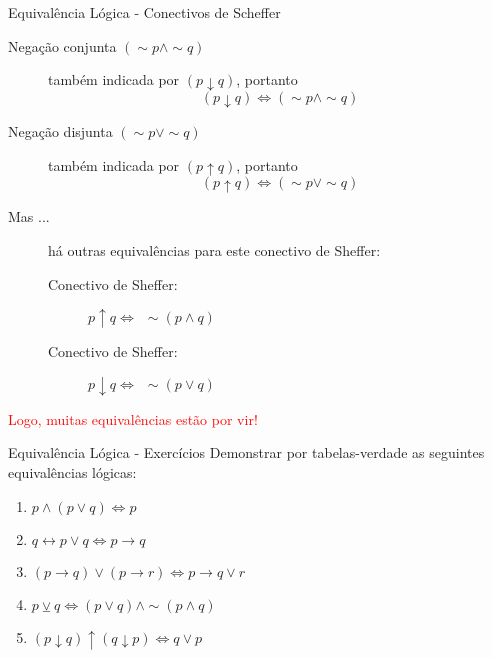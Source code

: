 \begin{frame}[t]{Equivalência Lógica - Conectivos de Scheffer} %
	
	
	\begin{description}
	\item [Negação conjunta $(\sim p \wedge \sim q)$] também indicada por $(p \downarrow q)$, 
	portanto $$(p \downarrow q) \Leftrightarrow  (\sim p \wedge \sim q)$$

	\item [Negação disjunta $(\sim p \vee \sim q)$] também indicada por $(p \uparrow q)$, 
	portanto $$(p \uparrow q) \Leftrightarrow (\sim p \vee \sim q)$$


  \pause
	\item [Mas ...] há outras equivalências para este conectivo de Sheffer:
	
	\begin{description}
	
	\item[Conectivo de Sheffer:] $ p \uparrow q \Leftrightarrow  \:\: \sim (p \wedge q) $

  \item[Conectivo de  Sheffer:] $ p \downarrow q \Leftrightarrow \:\: \sim (p \vee  q) $
  
  
	\end{description}	
	\end{description}
  \pause
 \textcolor{red}{Logo, muitas equivalências estão por vir!}


\end{frame}
\begin{frame}[t]{Equivalência Lógica - Exercícios} %
	Demonstrar por tabelas-verdade as seguintes equivalências lógicas:
	\begin{enumerate}
	\item $p \wedge (p \vee q) \Leftrightarrow p$
	\item $q \leftrightarrow p \vee q \Leftrightarrow p \rightarrow q$
	\item $(p \rightarrow q) \vee (p \rightarrow r) \Leftrightarrow p \rightarrow q \vee r$
	\item $p \veebar q \Leftrightarrow (p \vee q) \wedge \sim (p \wedge q)$
	\item $(p \downarrow q) \uparrow (q \downarrow p) \Leftrightarrow q \vee p$
	\end{enumerate}
\end{frame}
